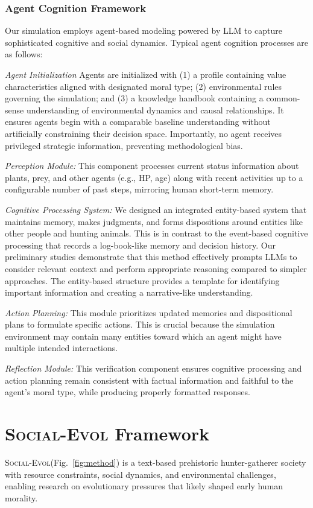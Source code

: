 \documentclass[letterpaper]{article} %
\newcommand{\envframe}{\textsc{Social-Evol}\xspace}
\begin{document}
\subsubsection{Agent Cognition Framework}
Our simulation employs agent-based modeling powered by LLM to capture sophisticated cognitive and social dynamics. Typical agent cognition processes are as follows: 

\textit{Agent Initialization} Agents are initialized with (1) a profile containing value characteristics aligned with designated moral type; (2) environmental rules governing the simulation; and (3) a knowledge handbook containing a common-sense understanding of environmental dynamics and causal relationships. It ensures agents begin with a comparable baseline understanding without artificially constraining their decision space. Importantly, no agent receives privileged strategic information, preventing methodological bias.

\textit{Perception Module:} This component processes current status information about plants, prey, and other agents (e.g., HP, age) along with recent activities up to a configurable number of past steps, mirroring human short-term memory.

\textit{Cognitive Processing System:} We designed an integrated entity-based system that maintains memory, makes judgments, and forms dispositions around entities like other people and hunting animals. This is in contrast to the event-based cognitive processing that records a log-book-like memory and decision history.  Our preliminary studies demonstrate that this method effectively prompts LLMs to consider relevant context and perform appropriate reasoning compared to simpler approaches. The entity-based structure provides a template for identifying important information and creating a narrative-like understanding.

\textit{Action Planning:} This module prioritizes updated memories and dispositional plans to formulate specific actions. This is crucial because the simulation environment may contain many entities toward which an agent might have multiple intended interactions.

\textit{Reflection Module:} This verification component ensures cognitive processing and action planning remain consistent with factual information and faithful to the agent's moral type, while producing properly formatted responses.



\section{\envframe Framework}
\envframe (Fig.~\ref{fig:method}) is a text-based prehistoric hunter-gatherer society with resource constraints, social dynamics, and environmental challenges, enabling research on evolutionary pressures that likely shaped early human morality.
\end{document}
